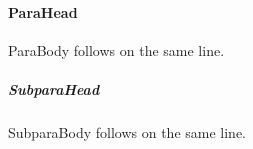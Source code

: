 \documentclass[10pt]{article}
\begin{document}
\paragraph{ParaHead} ParaBody follows on the same line.
\subparagraph{SubparaHead} SubparaBody follows on the same line.
\end{document}
